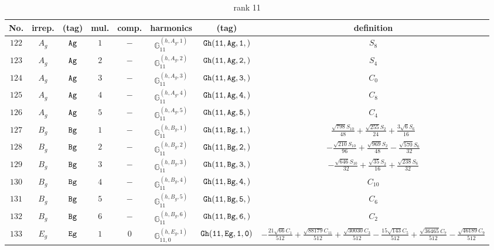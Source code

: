 \documentclass[fleqn,8pt]{jsarticle}
\begin{document}
\begin{table}[ht!]
\begin{center}
\caption{rank 11}
\renewcommand{\arraystretch}{1.3}
\begin{tabular}{cccccccc} \hline \hline
No. & irrep. & (tag) & mul. & comp. & harmonics & (tag) & definition \\ \hline
$ 122 $ & $ A_{g} $ & $ {\tt Ag} $ & $ 1 $ & $ - $ & $ \mathbb{G}_{11}^{(h,A_{g},1)} $ & $ {\tt Gh(11,Ag,1,)} $ & $ S_{8} $ \\
$ 123 $ & $ A_{g} $ & $ {\tt Ag} $ & $ 2 $ & $ - $ & $ \mathbb{G}_{11}^{(h,A_{g},2)} $ & $ {\tt Gh(11,Ag,2,)} $ & $ S_{4} $ \\
$ 124 $ & $ A_{g} $ & $ {\tt Ag} $ & $ 3 $ & $ - $ & $ \mathbb{G}_{11}^{(h,A_{g},3)} $ & $ {\tt Gh(11,Ag,3,)} $ & $ C_{0} $ \\
$ 125 $ & $ A_{g} $ & $ {\tt Ag} $ & $ 4 $ & $ - $ & $ \mathbb{G}_{11}^{(h,A_{g},4)} $ & $ {\tt Gh(11,Ag,4,)} $ & $ C_{8} $ \\
$ 126 $ & $ A_{g} $ & $ {\tt Ag} $ & $ 5 $ & $ - $ & $ \mathbb{G}_{11}^{(h,A_{g},5)} $ & $ {\tt Gh(11,Ag,5,)} $ & $ C_{4} $ \\
$ 127 $ & $ B_{g} $ & $ {\tt Bg} $ & $ 1 $ & $ - $ & $ \mathbb{G}_{11}^{(h,B_{g},1)} $ & $ {\tt Gh(11,Bg,1,)} $ & $ \frac{\sqrt{798} S_{10}}{48} + \frac{\sqrt{255} S_{2}}{24} + \frac{3 \sqrt{6} S_{6}}{16} $ \\
$ 128 $ & $ B_{g} $ & $ {\tt Bg} $ & $ 2 $ & $ - $ & $ \mathbb{G}_{11}^{(h,B_{g},2)} $ & $ {\tt Gh(11,Bg,2,)} $ & $ - \frac{\sqrt{210} S_{10}}{96} + \frac{\sqrt{969} S_{2}}{48} - \frac{\sqrt{570} S_{6}}{32} $ \\
$ 129 $ & $ B_{g} $ & $ {\tt Bg} $ & $ 3 $ & $ - $ & $ \mathbb{G}_{11}^{(h,B_{g},3)} $ & $ {\tt Gh(11,Bg,3,)} $ & $ - \frac{\sqrt{646} S_{10}}{32} + \frac{\sqrt{35} S_{2}}{16} + \frac{\sqrt{238} S_{6}}{32} $ \\
$ 130 $ & $ B_{g} $ & $ {\tt Bg} $ & $ 4 $ & $ - $ & $ \mathbb{G}_{11}^{(h,B_{g},4)} $ & $ {\tt Gh(11,Bg,4,)} $ & $ C_{10} $ \\
$ 131 $ & $ B_{g} $ & $ {\tt Bg} $ & $ 5 $ & $ - $ & $ \mathbb{G}_{11}^{(h,B_{g},5)} $ & $ {\tt Gh(11,Bg,5,)} $ & $ C_{6} $ \\
$ 132 $ & $ B_{g} $ & $ {\tt Bg} $ & $ 6 $ & $ - $ & $ \mathbb{G}_{11}^{(h,B_{g},6)} $ & $ {\tt Gh(11,Bg,6,)} $ & $ C_{2} $ \\
$ 133 $ & $ E_{g} $ & $ {\tt Eg} $ & $ 1 $ & $ 0 $ & $ \mathbb{G}_{11,0}^{(h,E_{g},1)} $ & $ {\tt Gh(11,Eg,1,0)} $ & $ - \frac{21 \sqrt{66} C_{1}}{512} + \frac{\sqrt{88179} C_{11}}{512} + \frac{\sqrt{30030} C_{3}}{512} - \frac{15 \sqrt{143} C_{5}}{512} + \frac{\sqrt{36465} C_{7}}{512} - \frac{\sqrt{46189} C_{9}}{512} $ \\

\end{tabular}
\end{center}
\end{table}
\end{document}
